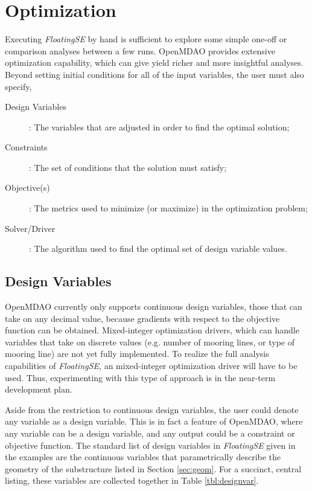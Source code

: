 \chapter{Optimization}
\label{sec:opt}
Executing \textit{FloatingSE} by hand is sufficient to explore some simple
one-off or comparison analyses between a few runs.  OpenMDAO
provides extensive optimization capability, which can give yield richer
and more insightful analyses.  Beyond setting initial conditions for all
of the input variables, the user must also specify,
\begin{description}
\item[Design Variables]: The variables that are adjusted in order to
  find the optimal solution;
\item[Constraints]: The set of conditions that the solution must satisfy;
\item[Objective(s)]: The metrics used to minimize (or maximize) in the
  optimization problem; 
\item[Solver/Driver]: The algorithm used to find the optimal set of
  design variable values.
\end{description}

\section{Design Variables}
OpenMDAO currently only supports continuous design variables, those that
can take on any decimal value, because gradients with respect to the
objective function can be obtained.  Mixed-integer optimization drivers,
which can handle variables that take on discrete values (e.g. number of
mooring lines, or type of mooring line) are not yet fully implemented.
To realize the full analysis capabilities of \textit{FloatingSE}, an
mixed-integer optimization driver will have to be used.  Thus,
experimenting with this type of approach is in the near-term development
plan.

Aside from the restriction to continuous design variables, the user
could denote any variable as a design variable.  This is in fact a
feature of OpenMDAO, where any variable can be a design
variable, and any output could be a constraint or objective function.
The standard list of design variables in \textit{FloatingSE} given in
the examples are the continuous variables that parametrically describe
the geometry of the substructure listed in Section \ref{sec:geom}.  For
a succinct, central listing, these variables are collected together in
Table \ref{tbl:designvar}.

